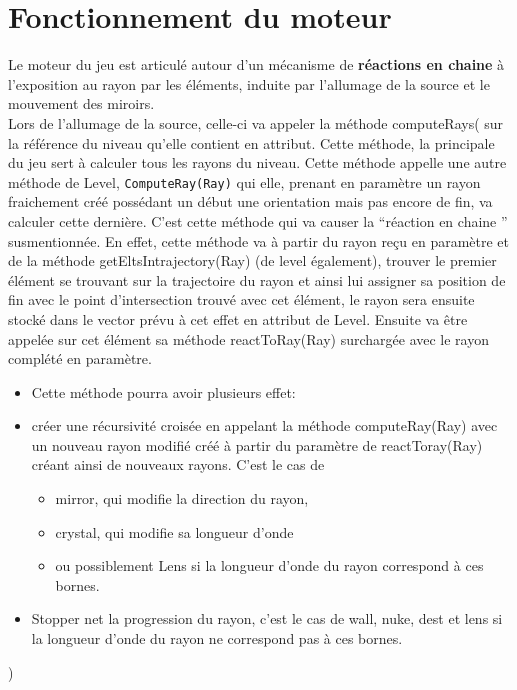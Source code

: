 \documentclass[a4paper,11pt]{report}
\begin{document}
\section[Moteur de jeu]{Fonctionnement du moteur}
Le moteur du jeu est articulé autour d'un mécanisme de \textbf{réactions en
chaine} à l'exposition au rayon par les éléments, induite par l'allumage de la source et le
mouvement des miroirs. \\

Lors de l'allumage de la source, celle-ci va appeler la méthode
computeRays( sur la référence du niveau qu'elle contient en attribut. Cette
méthode, la principale du jeu sert à calculer tous les rayons du niveau.
Cette méthode appelle une autre méthode de Level, \texttt{ComputeRay(Ray)} qui elle,
prenant en paramètre un rayon fraichement créé possédant un début une
orientation mais pas encore de fin, va calculer cette dernière. 
C'est cette méthode qui va causer la ``réaction en chaine '' susmentionnée. 
En effet, cette méthode va à partir du rayon reçu en paramètre et de la méthode
getEltsIntrajectory(Ray) (de level également), trouver le premier élément se
trouvant sur la trajectoire du rayon et ainsi lui assigner sa position de fin
avec le point d'intersection trouvé avec cet élément, le rayon sera ensuite
stocké dans le vector prévu à cet effet en attribut de Level. Ensuite va être
appelée sur cet élément sa méthode reactToRay(Ray) surchargée avec le rayon
complété en paramètre. \\

\begin{itemize}
	\item[] Cette méthode pourra avoir plusieurs effet:
	\item créer une récursivité croisée en appelant la méthode computeRay(Ray) avec un
nouveau rayon modifié créé à partir du paramètre de reactToray(Ray) créant ainsi
de nouveaux rayons. C'est le cas de 
\begin{itemize}
	\item mirror, qui modifie la direction du rayon,
	\item crystal, qui modifie sa longueur d'onde 
	\item ou possiblement Lens si la longueur d'onde du rayon correspond à ces bornes. 
\end{itemize}
    \item Stopper net la progression du rayon, c'est le cas de wall, nuke, dest et lens
    si la longueur d'onde du rayon ne correspond pas à ces bornes.
\end{itemize}
)
\end{document}
